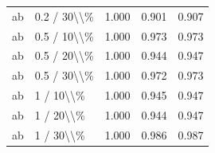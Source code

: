 \begin{table}[!h]
\begin{tabular}[t]{llccc}
\addlinespace
ab & 0.2 / 30\textbackslash{}\textbackslash{}\% & 1.000 & 0.901 & 0.907\\
ab & 0.5 / 10\textbackslash{}\textbackslash{}\% & 1.000 & 0.973 & 0.973\\
ab & 0.5 / 20\textbackslash{}\textbackslash{}\% & 1.000 & 0.944 & 0.947\\
ab & 0.5 / 30\textbackslash{}\textbackslash{}\% & 1.000 & 0.972 & 0.973\\
ab & 1 / 10\textbackslash{}\textbackslash{}\% & 1.000 & 0.945 & 0.947\\
\addlinespace
ab & 1 / 20\textbackslash{}\textbackslash{}\% & 1.000 & 0.944 & 0.947\\
ab & 1 / 30\textbackslash{}\textbackslash{}\% & 1.000 & 0.986 & 0.987\\
\bottomrule
\end{tabular}
\end{table}
